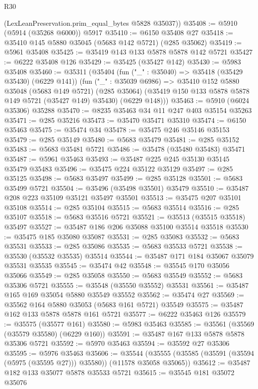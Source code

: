 \begin{lexlean}{R30}
\begin{coremodule}
      (LexLeanPreservation.prim_equal_bytes @5828 @35037))
@35408 := @5910 (@5914 (@35268 @6000)) @5917
@35410 := @6150 @35408 @27
@35418 := @35410 @145 @5880 @35045 (@5683 @142 @5721) (@285 @35062)
@35419 := @5961 @35408
@35425 := @35419 @143 @133 @5878 @5878 @142 @5721
@35427 := @6222 @35408 @126
@35429 := @35425 (@35427 @142)
@35430 := @5983 @35408
@35460 := @35311
    (@35404
      (fun ("_" : @35040) => @35418 (@35429 @35430) (@6229 @141))
      (fun ("_" : @35039 @6986) =>
      @35410
        @152
        @5880
        @35048
        (@5683 @149 @5721)
        (@285 @35064)
        (@35419 @150 @133 @5878 @5878 @149 @5721 (@35427 @149) @35430)
        (@6229 @148)))
@35463 := @5910 (@6024 @35306) @35288
@35470 := @8235 @35463 @34 @11 @247 @403 @35154 @35263
@35471 := @285 @35216
@35473 := @35470 @35471 @35310
@35474 := @6150 @35463
@35475 := @35474 @34
@35478 := @35475 @246 @35146 @35153
@35479 := @285 @35149
@35480 := @5683 @35479
@35481 := @285 @35152
@35483 := @5683 @35481 @5721
@35486 := @35478 (@35480 @35483) @35471
@35487 := @5961 @35463
@35493 := @35487 @225 @245 @35130 @35145 @35479 @35483
@35496 := @35475 @224 @35122 @35129
@35497 := @285 @35125
@35498 := @5683 @35497
@35499 := @285 @35128
@35501 := @5683 @35499 @5721
@35504 := @35496 (@35498 @35501) @35479
@35510 := @35487 @208 @223 @35109 @35121 @35497 @35501
@35513 := @35475 @207 @35101 @35108
@35514 := @285 @35104
@35515 := @5683 @35514
@35516 := @285 @35107
@35518 := @5683 @35516 @5721
@35521 := @35513 (@35515 @35518) @35497
@35527 := @35487 @186 @206 @35088 @35100 @35514 @35518
@35530 := @35475 @185 @35080 @35087
@35531 := @285 @35083
@35532 := @5683 @35531
@35533 := @285 @35086
@35535 := @5683 @35533 @5721
@35538 := @35530 (@35532 @35535) @35514
@35544 := @35487 @171 @184 @35067 @35079 @35531 @35535
@35545 := @35474 @42
@35548 := @35545 @170 @35056 @35066
@35549 := @285 @35058
@35550 := @5683 @35549
@35552 := @5683 @35306 @5721
@35555 := @35548 (@35550 @35552) @35531
@35561 := @35487 @165 @169 @35054 @5880 @35549 @35552
@35562 := @35474 @27
@35569 := @35562 @164 @5880 @35053 (@5683 @161 @5721) @35549
@35575 := @35487 @162 @133 @5878 @5878 @161 @5721
@35577 := @6222 @35463 @126
@35579 := @35575 (@35577 @161)
@35580 := @5983 @35463
@35585 := @35561 (@35569 (@35579 @35580) (@6229 @160))
@35591 := @35487 @167 @133 @5878 @5878 @35306 @5721
@35592 := @5970 @35463
@35594 := @35592 @27 @35306
@35595 := @5976 @35463
@35606 := @35544
    (@35555 (@35585 (@35591 (@35594 (@5975 (@35595 @27))) @35580)) (@11578 @35058 @35065))
@35612 := @35487 @182 @133 @35077 @5878 @35533 @5721
@35615 := @35545 @181 @35072 @35076

\end{coremodule}
\end{lexlean}
